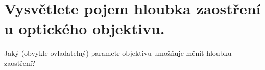 \section{Vysvětlete pojem hloubka zaostření u optického objektivu.}
Jaký (obvykle ovladatelný) parametr objektivu umožňuje měnit hloubku zaostření?